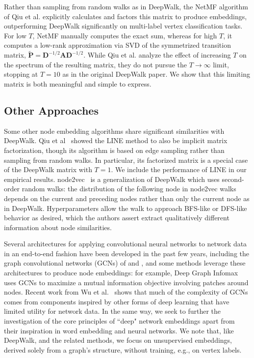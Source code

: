 \documentclass[sigconf]{acmart}
\newcommand{\mbf}[1]{\mathbf{#1}}
\begin{document}
Rather than sampling from random walks as in DeepWalk, the NetMF algorithm of Qiu et al. explicitly calculates and factors this matrix to produce embeddings, outperforming DeepWalk significantly on multi-label vertex classification tasks.
For low $T$, NetMF manually computes the exact sum, whereas for high $T$, it computes a low-rank approximation via SVD of the symmetrized transition matrix, $\mbf{\tilde{P}} = \mbf{D}^{-1/2}\mbf{A}\mbf{D}^{-1/2}$. While Qiu et al. analyze the effect of increasing $T$ on the spectrum of the resulting matrix, they do not pursue the $T \to \infty$ limit, stopping at $T=10$ as in the original DeepWalk paper. We show that this limiting matrix is both meaningful and simple to express.

\subsection{Other Approaches} Some other node embedding algorithms share significant similarities with DeepWalk. Qiu et al~\cite{qiu2018network} showed the LINE method to also be implicit matrix factorization, though its algorithm is based on edge sampling rather than sampling from random walks. In particular, its factorized matrix is a special case of the DeepWalk matrix with $T=1$. We include the performance of LINE in our empirical results.
node2vec~\cite{grover2016node2vec} is a generalization of DeepWalk which uses second-order random walks: the distribution of the following node in node2vec walks depends on the current and preceding nodes rather than only the current node as in DeepWalk. Hyperparameters allow the walk to approach BFS-like or DFS-like behavior as desired, which the authors assert extract qualitatively different information about node similarities.

Several architectures for applying convolutional neural networks to network data in an end-to-end fashion have been developed in the past few years, including the graph convolutional networks (GCNs) of \cite{kipf2016semi} and \cite{defferrard2016convolutional}, and some methods leverage these architectures to produce node embeddings: for example, Deep Graph Infomax~\cite{velivckovic2018deep} uses GCNs to maximize a mutual information objective involving patches around nodes. Recent work from Wu et al.~\cite{wu2019simplifying} shows that much of the complexity of GCNs comes from components inspired by other forms of deep learning that have limited utility for network data. In the same way, we seek to further the investigation of the core principles of ``deep" network embeddings apart from their inspiration in word embedding and neural networks. We note that, like DeepWalk, and the related methods, we focus on unsupervised embeddings, derived solely from a graph's structure, without training, e.g., on vertex labels.
\end{document}
